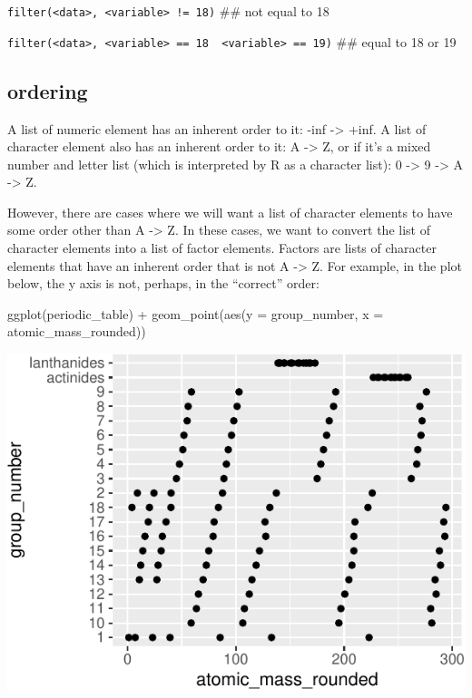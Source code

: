 \documentclass[
]{krantz}
\newenvironment{Shaded}{\begin{snugshade}}{\end{snugshade}}
\newcommand{\AttributeTok}[1]{\textcolor[rgb]{0.77,0.63,0.00}{#1}}
\newcommand{\FunctionTok}[1]{\textcolor[rgb]{0.00,0.00,0.00}{#1}}
\newcommand{\NormalTok}[1]{#1}
\newcommand{\SpecialCharTok}[1]{\textcolor[rgb]{0.00,0.00,0.00}{#1}}
\begin{document}
\texttt{filter(\textless{}data\textgreater{},\ \textless{}variable\textgreater{}\ !=\ 18)} \#\# not equal to 18

\texttt{filter(\textless{}data\textgreater{},\ \textless{}variable\textgreater{}\ ==\ 18\ \textbar{}\ \textless{}variable\textgreater{}\ ==\ 19)} \#\# equal to 18 or 19

\hypertarget{ordering}{%
\subsection{ordering}\label{ordering}}

A list of numeric element has an inherent order to it: -inf -\textgreater{} +inf. A list of character element also has an inherent order to it: A -\textgreater{} Z, or if it's a mixed number and letter list (which is interpreted by R as a character list): 0 -\textgreater{} 9 -\textgreater{} A -\textgreater{} Z.

However, there are cases where we will want a list of character elements to have some order other than A -\textgreater{} Z. In these cases, we want to convert the list of character elements into a list of factor elements. Factors are lists of character elements that have an inherent order that is not A -\textgreater{} Z. For example, in the plot below, the y axis is not, perhaps, in the ``correct'' order:

\begin{Shaded}
\begin{Highlighting}[]
\FunctionTok{ggplot}\NormalTok{(periodic\_table) }\SpecialCharTok{+}
  \FunctionTok{geom\_point}\NormalTok{(}\FunctionTok{aes}\NormalTok{(}\AttributeTok{y =}\NormalTok{ group\_number, }\AttributeTok{x =}\NormalTok{ atomic\_mass\_rounded))}
\end{Highlighting}
\end{Shaded}

\begin{center}\includegraphics[width=1\linewidth]{index_files/figure-latex/unnamed-chunk-190-1} \end{center}
\end{document}
